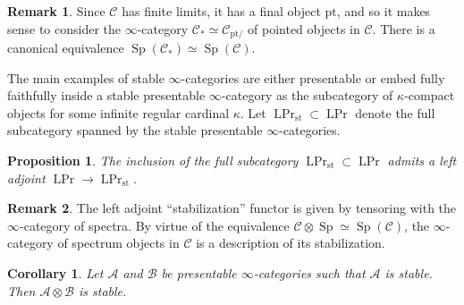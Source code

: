 \documentclass{article}
\newtheorem{corollary}{Corollary}[subsection]
\newtheorem{proposition}{Proposition}[subsection]
\theoremstyle{definition}
\newtheorem{remark}{Remark}[subsection]
\newcommand{\A}{\mathcal{A}}
\newcommand{\B}{\mathcal{B}}
\newcommand{\C}{\mathcal{C}}
\renewcommand{\i}{\infty}
\DeclareMathOperator{\Prl}{LPr}
\DeclareMathOperator{\Sp}{Sp}
\newcommand{\st}{\mathrm{st}}
\newcommand{\pt}{\mathrm{pt}}
\begin{document}
\begin{remark}
Since $\C$ has finite limits, it has a final object $\pt$, and so it makes sense to consider the $\infty$-category $\C_*\simeq\C_{\pt/}$ of pointed objects in $\C$.
There is a canonical equivalence $\Sp(\C_*)\simeq\Sp(\C)$.
\end{remark}



The main examples of stable $\infty$-categories are either presentable or embed fully faithfully inside a stable presentable $\infty$-category as the subcategory of $\kappa$-compact objects for some infinite regular cardinal $\kappa$.
Let $\Prl_{\st}\subset\Prl$\index{$\Prl_{\st}$} denote the full subcategory spanned by the stable presentable $\infty$-categories.
\begin{proposition}{\em \cite[Proposition 4.8.2.18]{HA}}
The inclusion of the full subcategory $\Prl_{\st}\subset\Prl$ admits a left adjoint $\Prl\to\Prl_{\st}$.
\end{proposition}
\begin{remark}
The left adjoint ``stabilization'' functor is given by tensoring with the $\i$-category of spectra.
By virtue of the equivalence
$\C\otimes\Sp\simeq\Sp(\C)$, the $\i$-category of spectrum objects in $\C$ is a description of its stabilization.
\end{remark}

\begin{corollary}
Let $\A$ and $\B$ be presentable $\infty$-categories such that $\A$ is stable.
Then $\A\otimes\B$ is stable.
\end{corollary}
\end{document}
